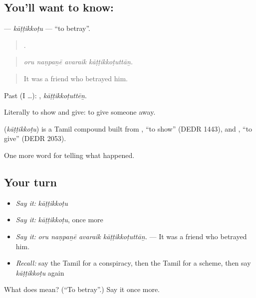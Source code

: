 \subsection*{You'll want to know: }
\textbf{} — \emph{kāṭṭikkoṭu} — \textquotedblleft{}to betray\textquotedblright{}.

\begin{quote}
   .
\end{quote}

\begin{quote}
\emph{oru naṇpaṉē avaraik kāṭṭikkoṭuttāṉ.}
\end{quote}

\begin{quote}
It was a friend who betrayed him.
\end{quote}

Past (I …): , \emph{kāṭṭikkoṭuttēṉ}.

Literally to show and give: to give someone away.

\begin{cousinweb}
\textbf{} (\emph{kāṭṭikkoṭu}) is a Tamil compound built from , \textquotedblleft{}to show\textquotedblright{} (DEDR 1443), and , \textquotedblleft{}to give\textquotedblright{} (DEDR 2053).
\end{cousinweb}

\begin{grammarlens}[title={What you've built}]
One more word for telling what happened.
\end{grammarlens}

\subsection*{Your turn}
\begin{itemize}
\raggedright
  \item \emph{Say it:} \emph{kāṭṭikkoṭu}
  \item \emph{Say it:} \emph{kāṭṭikkoṭu}, once more
  \item \emph{Say it:} \emph{oru naṇpaṉē avaraik kāṭṭikkoṭuttāṉ.} — It was a friend who betrayed him.
  \item \emph{Recall:} say the Tamil for a conspiracy, then the Tamil for a scheme, then say \emph{kāṭṭikkoṭu} again
\end{itemize}

\begin{tcolorbox}[breakable,colback=teal!4,colframe=teal!35!black,title={Before you move on}]
What does  mean? (\textquotedblleft{}To betray\textquotedblright{}.) Say it once more.
\end{tcolorbox}
